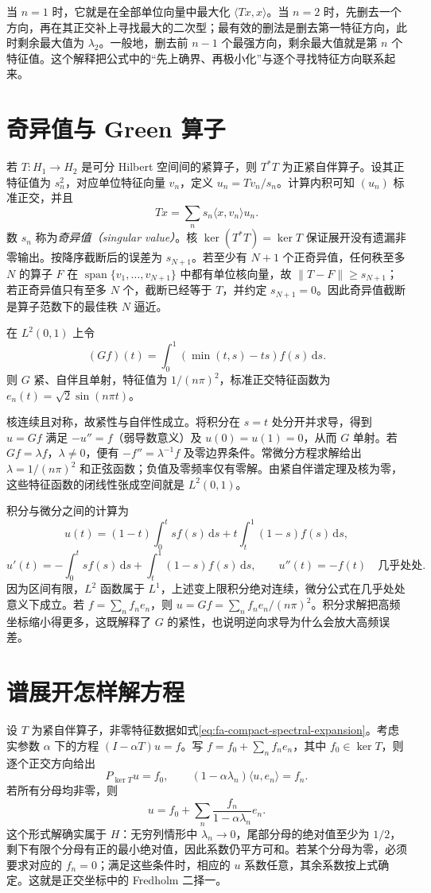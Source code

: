当 $n=1$ 时，它就是在全部单位向量中最大化 $\langle Tx,x\rangle$。当 $n=2$ 时，先删去一个方向，再在其正交补上寻找最大的二次型；最有效的删法是删去第一特征方向，此时剩余最大值为 $\lambda_2$。一般地，删去前 $n-1$ 个最强方向，剩余最大值就是第 $n$ 个特征值。这个解释把公式中的“先上确界、再极小化”与逐个寻找特征方向联系起来。

\section{奇异值与 Green 算子}
若 $T:H_1\to H_2$ 是可分 Hilbert 空间间的紧算子，则 $T^*T$ 为正紧自伴算子。设其正特征值为 $s_n^2$，对应单位特征向量 $v_n$，定义 $u_n=Tv_n/s_n$。计算内积可知 $(u_n)$ 标准正交，并且
\[
 Tx=\sum_n s_n\langle x,v_n\rangle u_n.
\]
数 $s_n$ 称为\emph{奇异值（singular value）}。核 $\ker(T^*T)=\ker T$ 保证展开没有遗漏非零输出。按降序截断后的误差为 $s_{N+1}$。若至少有 $N+1$ 个正奇异值，任何秩至多 $N$ 的算子 $F$ 在 $\operatorname{span}\{v_1,\ldots,v_{N+1}\}$ 中都有单位核向量，故 $\|T-F\|\geq s_{N+1}$；若正奇异值只有至多 $N$ 个，截断已经等于 $T$，并约定 $s_{N+1}=0$。因此奇异值截断是算子范数下的最佳秩 $N$ 逼近。

\begin{example}\label{ex:fa-green}
在 $L^2(0,1)$ 上令
\[
 (Gf)(t)=\int_0^1(\min(t,s)-ts)f(s)\,\mathrm ds.
\]
则 $G$ 紧、自伴且单射，特征值为 $1/(n\pi)^2$，标准正交特征函数为 $e_n(t)=\sqrt2\sin(n\pi t)$。
\end{example}
\begin{solve}
核连续且对称，故紧性与自伴性成立。将积分在 $s=t$ 处分开并求导，得到 $u=Gf$ 满足 $-u''=f$（弱导数意义）及 $u(0)=u(1)=0$，从而 $G$ 单射。若 $Gf=\lambda f$，$\lambda\ne0$，便有 $-f''=\lambda^{-1}f$ 及零边界条件。常微分方程求解给出 $\lambda=1/(n\pi)^2$ 和正弦函数；负值及零频率仅有零解。由紧自伴谱定理及核为零，这些特征函数的闭线性张成空间就是 $L^2(0,1)$。
\end{solve}

积分与微分之间的计算为
\[
 u(t)=(1-t)\int_0^t sf(s)\,\mathrm ds
       +t\int_t^1(1-s)f(s)\,\mathrm ds,
\]
\[
 u'(t)=-\int_0^t sf(s)\,\mathrm ds
       +\int_t^1(1-s)f(s)\,\mathrm ds,
 \qquad u''(t)=-f(t)\quad\text{几乎处处}.
\]
因为区间有限，$L^2$ 函数属于 $L^1$，上述变上限积分绝对连续，微分公式在几乎处处意义下成立。若 $f=\sum_nf_ne_n$，则 $u=Gf=\sum_n f_n e_n/(n\pi)^2$。积分求解把高频坐标缩小得更多，这既解释了 $G$ 的紧性，也说明逆向求导为什么会放大高频误差。

\section{谱展开怎样解方程}
设 $T$ 为紧自伴算子，非零特征数据如式\eqref{eq:fa-compact-spectral-expansion}。考虑实参数 $\alpha$ 下的方程 $(I-\alpha T)u=f$。写 $f=f_0+\sum_nf_ne_n$，其中 $f_0\in\ker T$，则逐个正交方向给出
\[
 P_{\ker T}u=f_0,\qquad (1-\alpha\lambda_n)\langle u,e_n\rangle=f_n.
\]
若所有分母均非零，则
\[
 u=f_0+\sum_n\frac{f_n}{1-\alpha\lambda_n}e_n.
\]
这个形式解确实属于 $H$：无穷列情形中 $\lambda_n\to0$，尾部分母的绝对值至少为 $1/2$，剩下有限个分母有正的最小绝对值，因此系数仍平方可和。若某个分母为零，必须要求对应的 $f_n=0$；满足这些条件时，相应的 $u$ 系数任意，其余系数按上式确定。这就是正交坐标中的 Fredholm 二择一。

